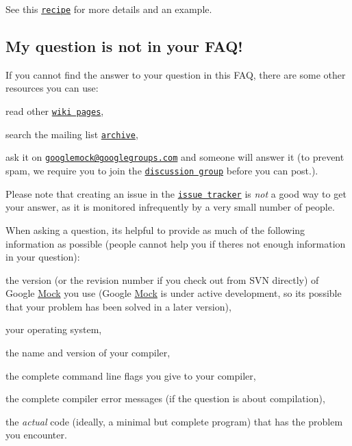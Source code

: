 See this \href{http://code.google.com/p/googlemock/wiki/V1_6_CookBook#Mocking_Side_Effects}{\tt recipe} for more details and an example.

\subsection*{My question is not in your F\+A\+Q!}

If you cannot find the answer to your question in this F\+AQ, there are some other resources you can use\+:


\begin{DoxyEnumerate}
\item read other \href{http://code.google.com/p/googlemock/w/list}{\tt wiki pages},
\end{DoxyEnumerate}
\begin{DoxyEnumerate}
\item search the mailing list \href{http://groups.google.com/group/googlemock/topics}{\tt archive},
\end{DoxyEnumerate}
\begin{DoxyEnumerate}
\item ask it on \href{mailto:googlemock@googlegroups.com}{\tt googlemock@googlegroups.\+com} and someone will answer it (to prevent spam, we require you to join the \href{http://groups.google.com/group/googlemock}{\tt discussion group} before you can post.).
\end{DoxyEnumerate}

Please note that creating an issue in the \href{http://code.google.com/p/googlemock/issues/list}{\tt issue tracker} is {\itshape not} a good way to get your answer, as it is monitored infrequently by a very small number of people.

When asking a question, it\textquotesingle{}s helpful to provide as much of the following information as possible (people cannot help you if there\textquotesingle{}s not enough information in your question)\+:


\begin{DoxyItemize}
\item the version (or the revision number if you check out from S\+VN directly) of Google \hyperlink{class_mock}{Mock} you use (Google \hyperlink{class_mock}{Mock} is under active development, so it\textquotesingle{}s possible that your problem has been solved in a later version),
\item your operating system,
\item the name and version of your compiler,
\item the complete command line flags you give to your compiler,
\item the complete compiler error messages (if the question is about compilation),
\item the {\itshape actual} code (ideally, a minimal but complete program) that has the problem you encounter. 
\end{DoxyItemize}